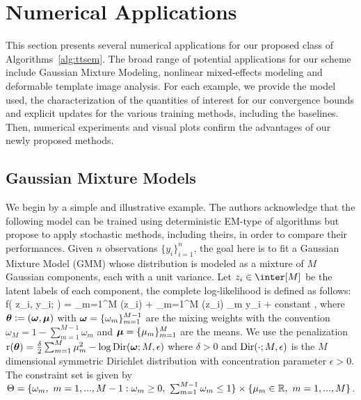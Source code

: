 \documentclass[journal, 11pt]{IEEEtran}
\begin{document}
\section{Numerical Applications}\label{sec:numerical}


This section presents several numerical applications for our proposed class of Algorithms~\ref{alg:ttsem}.
The broad range of potential applications for our scheme include Gaussian Mixture Modeling, nonlinear mixed-effects modeling and deformable template image analysis.
For each example, we provide the model used, the characterization of the quantities of interest for our convergence bounds and explicit updates for the various training methods, including the baselines.
Then, numerical experiments and visual plots confirm the advantages of our newly proposed methods.



\subsection{Gaussian Mixture Models}


We begin by a simple and illustrative example.
The authors acknowledge that the following model can be trained using deterministic EM-type of algorithms but propose to apply stochastic methods, including theirs, in order to compare their performances.
Given $n$ observations $\{y_i\}_{i=1}^n$, the goal here is to fit a Gaussian Mixture Model (GMM) whose distribution is modeled as a mixture of $M$ Gaussian components, each with a unit variance. 
Let $z_i \in \inter[M]$ be the latent labels of each component, the complete log-likelihood is defined as follows:
\beq \notag \textstyle
 \log f( z_i, y_i; \param) =
\sum_{m=1}^{M} (z_i)  + \sum_{m=1}^M (z_i) \mu_m y_i + {\rm constant} \eqsp,
\eeq
where ${\bm{\theta}} \mathrel{\mathop:}= (\boldsymbol{\omega}, \boldsymbol{\mu})$ with $\boldsymbol{\omega}= \{\omega_{m}\}_{m=1}^{M-1}$ are the mixing weights with the convention $\omega_M= 1 - \sum_{m=1}^{M-1} \omega_m$  and $\boldsymbol{\mu}= \{\mu_m \}_{m =1}^M$ are the means.  
We use the penalization $\operatorname{r}({\bm{\theta}})= \frac{\delta}{2}\sum_{m=1}^M \mu_m^2 - \log \operatorname{Dir}(\boldsymbol{\omega}; M, \epsilon)$ where $\delta > 0$ and $\operatorname{Dir}(\cdot; M,\epsilon)$ is the $M$ dimensional symmetric Dirichlet distribution with concentration parameter $\epsilon > 0$.
The constraint set is given by $\Theta = \{ \omega_m,~m=1,...,M-1 : \omega_m \geq 0,~\sum_{m=1}^{M-1} \omega_m \leq 1\} \times \{ \mu_m \in \mathbb{R} ,~m=1,...,M \}$. 
\end{document}

